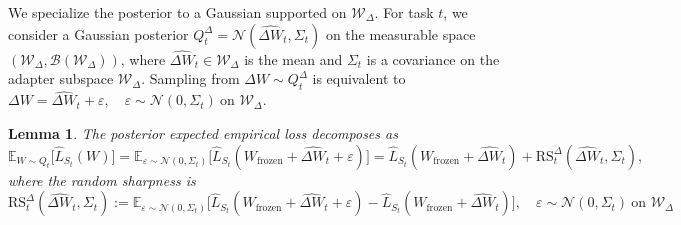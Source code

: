 \documentclass{article}
\theoremstyle{plain}
\newtheorem{lemma}[theorem]{Lemma}
\theoremstyle{definition}
\theoremstyle{remark}
\begin{document}
We specialize the posterior to a Gaussian supported on $\mathcal W_\Delta$. For task $t$, we consider a Gaussian posterior \( Q_t^{\Delta} = \mathcal{N}(\hat{\Delta W}_t, \Sigma_t) \) on the measurable space \( (\mathcal{W}_\Delta, \mathcal{B}(\mathcal{W}_\Delta)) \), where \( \hat{\Delta W}_t \in \mathcal{W}_\Delta \) is the mean and \( \Sigma_t\) is a covariance on the adapter subspace \( \mathcal{W}_\Delta \). Sampling from \( \Delta W \sim Q_t^{\Delta} \) is equivalent to 
$
\Delta W = \hat{\Delta W}_t + \varepsilon, \quad \varepsilon \sim \mathcal{N}(0, \Sigma_t) \ \text{on } \mathcal{W}_\Delta.
$ 

\begin{lemma}
    The posterior expected empirical loss decomposes as
\begin{equation*}
    \mathbb{E}_{W\sim Q_t}\big[\hat{L}_{S_t}(W)\big]
= \mathbb{E}_{\varepsilon\sim\mathcal N(0,\Sigma_t)}
    \big[\hat{L}_{S_t}(W_\mathrm {frozen }+\hat{\Delta W}_t+\varepsilon)\big]
= \hat{L}_{S_t}(W_\mathrm {frozen }+\hat{\Delta W}_t)
  + \mathrm{RS}_t^{\Delta}(\hat{\Delta W}_t,\Sigma_t),
\end{equation*}
where the random sharpness is
$$
\mathrm{RS}_t^{\Delta}(\hat{\Delta W}_t,\Sigma_t)
:= \mathbb{E}_{\varepsilon\sim\mathcal N(0,\Sigma_t)}
   \big[\hat{L}_{S_t}(W_\mathrm {frozen }+\hat{\Delta W}_t+\varepsilon)
       - \hat{L}_{S_t}(W_\mathrm {frozen }+\hat{\Delta W}_t)\big],\quad
\varepsilon\sim\mathcal N(0,\Sigma_t)\ \text{on } \mathcal W_\Delta$$
\end{lemma}
\end{document}
